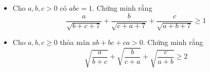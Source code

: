\documentclass[11pt]{scrartcl}
\begin{document}
\begin{itemize}[label=, leftmargin=0em, itemsep=-0em]
\begin{btvn}
        \end{btvn}

        \item\begin{btvn}
            Cho $a,b,c > 0$ có $abc = 1$. Chứng minh rằng
            \[
                \frac{a}{\sqrt{b + c + 7}} + \frac{b}{\sqrt{c + a + 7}} + \frac{c}{\sqrt{a + b + 7}} \geq 1
            \]
        \end{btvn}

        \item\begin{btvn}
            Cho $a,b,c \geq 0$ thỏa mãn $ab + bc + ca > 0$. Chứng minh rằng
            \[\sqrt{\frac{a}{b + c}} + \sqrt{\frac{b}{c + a}}+ \sqrt{\frac{c}{a+ b}} \geq 2
            \]
        \end{btvn}

    

\end{itemize}
\end{document}
